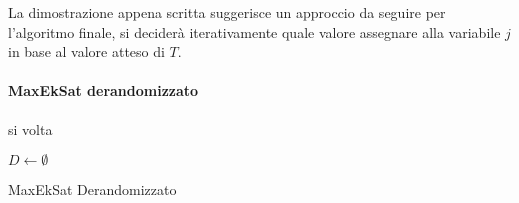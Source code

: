 \begin{remark}
    La dimostrazione appena scritta suggerisce un approccio da seguire per l'algoritmo finale, 
    si deciderà iterativamente quale valore assegnare alla variabile $j$ in base al valore atteso di 
    $T$.
\end{remark}

\paragraph{MaxEkSat derandomizzato}
si volta

\begin{algorithm}[H]
    \SetAlgoLined
    $D \gets \emptyset$\\
    \caption{MaxEkSat Derandomizzato}
\end{algorithm}

